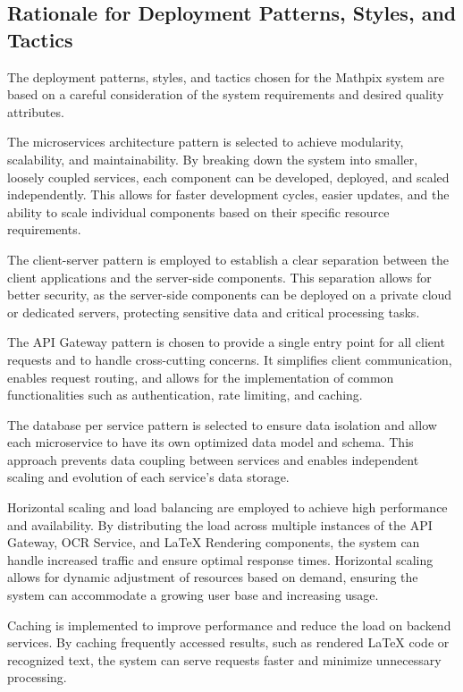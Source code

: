 \documentclass{article}
\begin{document}
\subsection{Rationale for Deployment Patterns, Styles, and Tactics}
The deployment patterns, styles, and tactics chosen for the Mathpix system are based on a careful consideration of the system requirements and desired quality attributes.

The microservices architecture pattern is selected to achieve modularity, scalability, and maintainability. By breaking down the system into smaller, loosely coupled services, each component can be developed, deployed, and scaled independently. This allows for faster development cycles, easier updates, and the ability to scale individual components based on their specific resource requirements.

The client-server pattern is employed to establish a clear separation between the client applications and the server-side components. This separation allows for better security, as the server-side components can be deployed on a private cloud or dedicated servers, protecting sensitive data and critical processing tasks.

The API Gateway pattern is chosen to provide a single entry point for all client requests and to handle cross-cutting concerns. It simplifies client communication, enables request routing, and allows for the implementation of common functionalities such as authentication, rate limiting, and caching.

The database per service pattern is selected to ensure data isolation and allow each microservice to have its own optimized data model and schema. This approach prevents data coupling between services and enables independent scaling and evolution of each service's data storage.

Horizontal scaling and load balancing are employed to achieve high performance and availability. By distributing the load across multiple instances of the API Gateway, OCR Service, and LaTeX Rendering components, the system can handle increased traffic and ensure optimal response times. Horizontal scaling allows for dynamic adjustment of resources based on demand, ensuring the system can accommodate a growing user base and increasing usage.

Caching is implemented to improve performance and reduce the load on backend services. By caching frequently accessed results, such as rendered LaTeX code or recognized text, the system can serve requests faster and minimize unnecessary processing.
\end{document}
